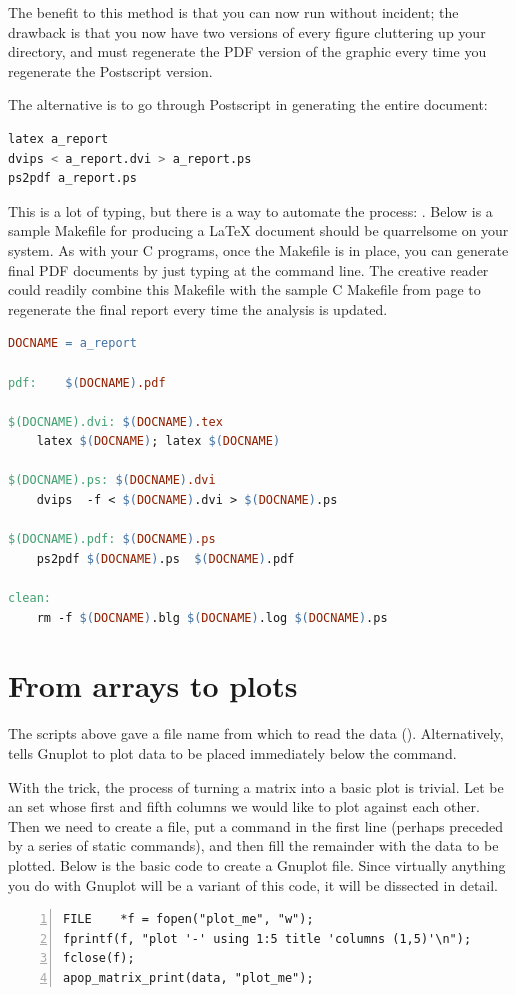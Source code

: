 The benefit to this method is that you can now run  without incident; the drawback is that you now have two
versions of every figure cluttering up your directory, and must
regenerate the PDF version of the graphic every time you regenerate the Postscript
version.

The alternative is to go through Postscript in generating the entire
document:
\begin{lstlisting}[language=sql]
latex a_report
dvips < a_report.dvi > a_report.ps
ps2pdf a_report.ps
\end{lstlisting}

This is a lot of typing, but there is a way to automate the process:
. Below is a sample Makefile for producing a \LaTeX{} document
should  be quarrelsome on your system. As with your C
programs, once the Makefile is in place, you can generate final PDF
documents by just typing  at the command line. The
creative reader could readily combine this Makefile with the sample C
Makefile from page \pageref{make} to regenerate the final report every
time the analysis is updated.

\begin{lstlisting}[language=make]
DOCNAME = a_report

pdf:	$(DOCNAME).pdf

$(DOCNAME).dvi: $(DOCNAME).tex
	latex $(DOCNAME); latex $(DOCNAME)

$(DOCNAME).ps: $(DOCNAME).dvi
	dvips  -f < $(DOCNAME).dvi > $(DOCNAME).ps

$(DOCNAME).pdf: $(DOCNAME).ps
	ps2pdf $(DOCNAME).ps  $(DOCNAME).pdf

clean:
	rm -f $(DOCNAME).blg $(DOCNAME).log $(DOCNAME).ps
\end{lstlisting}


\section{From arrays to plots} \label{gnuprint}
The scripts above gave a file name from which to read the data ().  Alternatively,  tells Gnuplot to
plot data to be placed immediately below the  command.

With
the  trick, the process of turning a matrix into a basic plot is
trivial. Let  be an  set whose first and fifth
columns we would like to plot against each other. Then we need to create
a file, put a  command in the first line (perhaps preceded by a series of 
static  commands), and then fill the
remainder with the data to be plotted. Below is the basic code to create
a Gnuplot file. Since virtually anything you do with Gnuplot will be a
variant of this code, it will be dissected in detail.  
  \label{fprintf}
\begin{lstlisting}[numbers=left, numberstyle=\scshape]
FILE    *f = fopen("plot_me", "w");
fprintf(f, "plot '-' using 1:5 title 'columns (1,5)'\n");
fclose(f);
apop_matrix_print(data, "plot_me");
\end{lstlisting}

